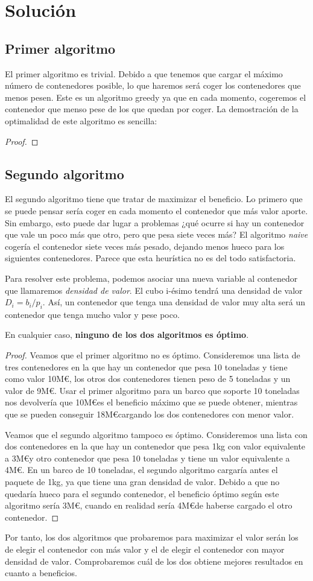 \documentclass[a4paper, 11pt]{article}
\begin{document}
\section{Solución}
\subsection{Primer algoritmo}
El primer algoritmo es trivial. Debido a que tenemos que cargar el máximo número de contenedores posible, lo que haremos será coger los contenedores que menos pesen. Este es un algoritmo greedy ya que en cada momento, cogeremos el contenedor que menso pese de los que quedan por coger. La demostración de la optimalidad de este algoritmo es sencilla:
\begin{proof}

\end{proof}

\subsection{Segundo algoritmo}
El segundo algoritmo tiene que tratar de maximizar el beneficio. Lo primero que se puede pensar sería coger en cada momento el contenedor que más valor aporte. Sin embargo, esto puede dar lugar a problemas ¿qué ocurre si hay un contenedor que vale un poco más que otro, pero que pesa siete veces más? El algoritmo \textit{naive} cogería el contenedor siete veces más pesado, dejando menos hueco para los siguientes contenedores. Parece que esta heurística no es del todo satisfactoria.

Para resolver este problema, podemos asociar una nueva variable al contenedor que llamaremos \textit{densidad de valor}. El cubo i-ésimo tendrá una densidad de valor $D_i = b_i/p_i$. Así, un contenedor que tenga una densidad de valor muy alta será un contenedor que tenga mucho valor y pese poco.

En cualquier caso, \textbf{ninguno de los dos algoritmos es óptimo}.

\begin{proof}
Veamos que el primer algoritmo no es óptimo. Consideremos una lista de tres contenedores en la que hay un contenedor que pesa 10 toneladas y tiene como valor 10M\euro, los otros dos contenedores tienen peso de 5 toneladas y un valor de 9M\euro. Usar el primer algoritmo para un barco que soporte 10 toneladas nos devolvería que 10M\euro es el beneficio máximo que se puede obtener, mientras que se pueden conseguir 18M\euro cargando los dos contenedores con menor valor.

Veamos que el segundo algoritmo tampoco es óptimo. Consideremos una lista con dos contenedores en la que hay un contenedor que pesa 1kg con valor equivalente a 3M\euro y otro contenedor que pesa 10 toneladas y tiene un valor equivalente a 4M\euro. En un barco de 10 toneladas, el segundo algoritmo cargaría antes el paquete de 1kg, ya que tiene una gran densidad de valor. Debido a que no quedaría hueco para el segundo contenedor, el beneficio óptimo según este algoritmo sería 3M\euro, cuando en realidad sería 4M\euro de haberse cargado el otro contenedor.

\end{proof}

Por tanto, los dos algoritmos que probaremos para maximizar el valor serán los de elegir el contenedor con más valor y el de elegir el contenedor con mayor densidad de valor. Comprobaremos cuál de los dos obtiene mejores resultados en cuanto a beneficios.
\end{document}
